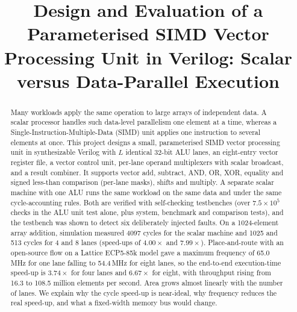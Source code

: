 \documentclass[conference]{IEEEtran}
\begin{document}
\title{Design and Evaluation of a Parameterised SIMD Vector Processing Unit in Verilog: Scalar versus Data-Parallel Execution}

\author{
}

\maketitle

\begin{abstract}
Many workloads apply the same operation to large arrays of independent data. A scalar processor handles such data-level parallelism one element at a time, whereas a Single-Instruction-Multiple-Data (SIMD) unit applies one instruction to several elements at once. This project designs a small, parameterised SIMD vector processing unit in synthesizable Verilog with $L$ identical 32-bit ALU lanes, an eight-entry vector register file, a vector control unit, per-lane operand multiplexers with scalar broadcast, and a result combiner. It supports vector add, subtract, AND, OR, XOR, equality and signed less-than comparison (per-lane masks), shifts and multiply. A separate scalar machine with one ALU runs the same workload on the same data and under the same cycle-accounting rules. Both are verified with self-checking testbenches (over $7.5\times10^{5}$ checks in the ALU unit test alone, plus system, benchmark and comparison tests), and the testbench was shown to detect six deliberately injected faults. On a 1024-element array addition, simulation measured 4097 cycles for the scalar machine and 1025 and 513 cycles for 4 and 8 lanes (speed-ups of $4.00\times$ and $7.99\times$). Place-and-route with an open-source flow on a Lattice ECP5-85k model gave a maximum frequency of 65.0\,MHz for one lane falling to 54.4\,MHz for eight lanes, so the end-to-end execution-time speed-up is $3.74\times$ for four lanes and $6.67\times$ for eight, with throughput rising from 16.3 to 108.5 million elements per second. Area grows almost linearly with the number of lanes. We explain why the cycle speed-up is near-ideal, why frequency reduces the real speed-up, and what a fixed-width memory bus would change.
\end{abstract}
\end{document}
